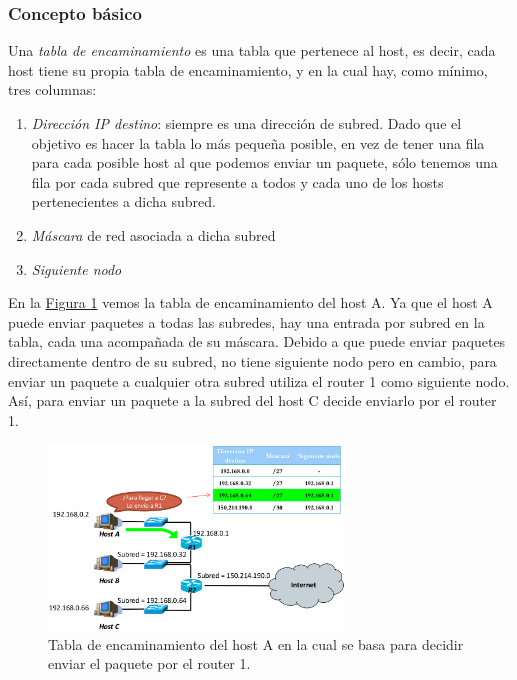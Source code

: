 \documentclass[10pt,a4paper,spanish]{report}
\begin{document}
\subsubsection{\textcolor{tema4}Concepto básico}
Una \textit{\textcolor{tema4}{tabla de encaminamiento}} es una tabla que pertenece al host, es decir, cada host tiene su propia tabla de encaminamiento, y en la cual hay, como mínimo, tres columnas: 
\begin{enumerate}[\color{tema4}{$\longrightarrow$}]
  \item \textit{\textcolor{tema4}{Dirección IP destino}}: siempre es una dirección de subred. Dado que el objetivo es hacer la tabla lo más pequeña posible, en vez de tener una fila para cada posible host al que podemos enviar un paquete, sólo tenemos una fila por cada subred que represente a todos y cada uno de los hosts pertenecientes a dicha subred.
  \item \textit{\textcolor{tema4}{Máscara}} de red asociada a dicha subred
  \item \textit{\textcolor{tema4}{Siguiente nodo}}
\end{enumerate}

En la \hyperref[tablaenc1]{Figura \ref*{tablaenc1}} vemos la tabla de encaminamiento del host A. Ya que el host A puede enviar paquetes a todas las subredes, hay una entrada por subred en la tabla, cada una acompañada de su máscara. Debido a que puede enviar paquetes directamente dentro de su subred, no tiene siguiente nodo pero en cambio, para enviar un paquete a cualquier otra subred utiliza el router 1 como siguiente nodo. Así, para enviar un paquete a la subred del host C decide enviarlo por el router 1.

\begin{figure}[!h]
  \centering
  \includegraphics[width=0.7\textwidth]{tablaenc1}
  \caption{Tabla de encaminamiento del host A en la cual se basa para decidir enviar el paquete por el router 1.}
  \label{tablaenc1}
\end{figure}
\end{document}
